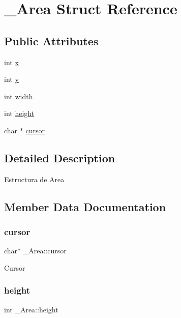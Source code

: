 \hypertarget{struct__Area}{}\section{\+\_\+\+Area Struct Reference}
\label{struct__Area}
\subsection*{Public Attributes}
\begin{DoxyCompactItemize}
\item 
int \hyperlink{struct__Area_a093b8c2929094bac88bbf5ee7db85573}{x}
\item 
int \hyperlink{struct__Area_a867e601f05480db03237c3a17d4c77f8}{y}
\item 
int \hyperlink{struct__Area_aa2f753fc3d254821603ac4512db814f1}{width}
\item 
int \hyperlink{struct__Area_a22627de8e529d631c17157f1f68cb5ac}{height}
\item 
char $\ast$ \hyperlink{struct__Area_aa042b0549789b75fd133b67ad7d0fd9d}{cursor}
\end{DoxyCompactItemize}


\subsection{Detailed Description}
Estructura de Area 

\subsection{Member Data Documentation}
\mbox{\label{struct__Area_aa042b0549789b75fd133b67ad7d0fd9d}} 
\subsubsection{\texorpdfstring{cursor}{cursor}}
{\footnotesize\ttfamily char$\ast$ \+\_\+\+Area\+::cursor}

Cursor \mbox{\label{struct__Area_a22627de8e529d631c17157f1f68cb5ac}} 
\subsubsection{\texorpdfstring{height}{height}}
{\footnotesize\ttfamily int \+\_\+\+Area\+::height}

